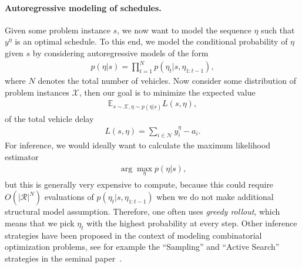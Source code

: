 \documentclass[a4paper]{report}
\theoremstyle{definition}
\theoremstyle{plain}
\begin{document}
\paragraph{Autoregressive modeling of schedules.}
Given some problem instance $s$, we now want to model the sequence $\eta$ such
that $y^{\eta}$ is an optimal schedule. To this end, we model the conditional
probability of $\eta$ given $s$ by considering autoregressive models of the form
\begin{align}
  \label{eq:autoregressive}
  p(\eta | s) = \prod_{t=1}^{N} p(\eta_{t} | s, \eta_{1:t-1}) ,
\end{align}
where $N$ denotes the total number of vehicles. Now consider some distribution
of problem instances $\mathcal{X}$, then our goal is to minimize the expected
value
\begin{align*}
  \mathbb{E}_{s \sim \mathcal{X}, \eta \sim p(\eta | s)} L(s, \eta) ,
\end{align*}
of the total vehicle delay
\begin{align*}
  L(s, \eta) = \sum_{i \in \mathcal{N}} y^{\eta}_{i} - a_{i} .
\end{align*}
%
For inference, we would ideally want to calculate the maximum likelihood
estimator
\begin{align*}
  \arg\max_{\eta} p(\eta | s) ,
\end{align*}
but this is generally very expensive to compute, because this could require
$O(|\mathcal{R}|^{N})$ evaluations of $p(\eta_{t} | s, \eta_{1:t-1})$ when we do
not make additional structural model assumption. Therefore, one often uses
\textit{greedy rollout}, which means that we pick $\eta_{t}$ with the highest
probability at every step.
Other inference strategies have been proposed in the context of modeling
combinatorial optimization problems, see for example the ``Sampling'' and
``Active Search'' strategies in the seminal
paper~\cite{belloNeuralCombinatorialOptimization2017}.
\end{document}
